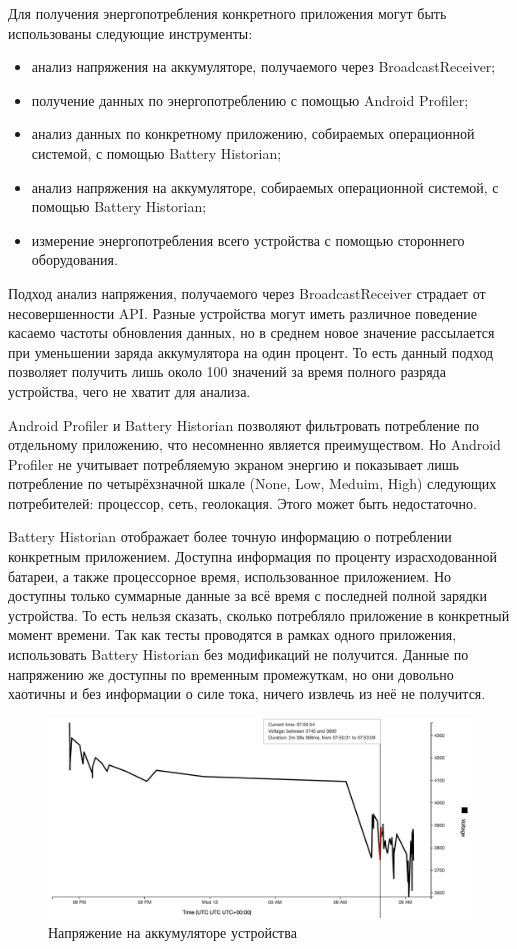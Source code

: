 \documentclass[a4paper,14pt]{extarticle} %
\begin{document}
	Для получения энергопотребления конкретного приложения могут быть использованы следующие инструменты:
	\begin{itemize}
		\item анализ напряжения на аккумуляторе, получаемого через BroadcastReceiver;
		\item получение данных по энергопотреблению с помощью Android Profiler;
		\item анализ данных по конкретному приложению, собираемых операционной системой, с помощью Battery Historian;
		\item анализ напряжения на аккумуляторе, собираемых операционной системой, с помощью Battery Historian;
		\item измерение энергопотребления всего устройства с помощью стороннего оборудования.
	\end{itemize}

	Подход анализ напряжения, получаемого через BroadcastReceiver страдает от несовершенности API. Разные устройства могут иметь различное поведение касаемо частоты обновления данных, но в среднем новое значение рассылается при уменьшении заряда аккумулятора на один процент. То есть данный подход позволяет получить лишь около 100 значений за время полного разряда устройства, чего не хватит для анализа.
	
	Android Profiler и Battery Historian позволяют фильтровать потребление по отдельному приложению, что несомненно является преимуществом. Но Android Profiler не учитывает потребляемую экраном энергию и показывает лишь потребление по четырёхзначной шкале (None, Low, Meduim, High) следующих потребителей: процессор, сеть, геолокация. Этого может быть недостаточно.
	
	Battery Historian отображает более точную информацию о потреблении конкретным приложением. Доступна информация по проценту израсходованной батареи, а также процессорное время, использованное приложением. Но доступны только суммарные данные за всё время с последней полной зарядки устройства. То есть нельзя сказать, сколько потребляло приложение в конкретный момент времени. Так как тесты проводятся в рамках одного приложения, использовать Battery Historian без модификаций не получится. Данные по напряжению же доступны по временным промежуткам, но они довольно хаотичны \ris{\ref{fig:historian_voltage}} и без информации о силе тока, ничего извлечь из неё не получится.
	
	\begin{figure}[htb]
		\includegraphics[width=\textwidth]{historian_voltage}
		\caption{Напряжение на аккумуляторе устройства}
		\label{fig:historian_voltage}
	\end{figure}
\end{document}
